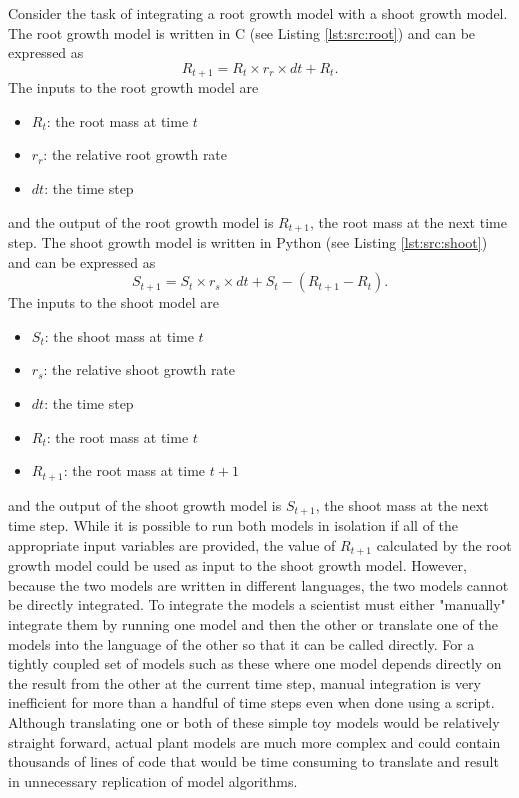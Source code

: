 \documentclass[journal]{IEEEtran}
\begin{document}
Consider the task of integrating a root growth model with a shoot growth model. The root growth model is written in C (see Listing \ref{lst:src:root}) and can be expressed as
\begin{equation}
R_{t+1} = R_{t} \times r_{r} \times dt + R_{t}.
\end{equation}
The inputs to the root growth model are
\begin{itemize}
	\item $R_{t}$: the root mass at time $t$
	\item $r_{r}$: the relative root growth rate
	\item $dt$: the time step
\end{itemize}
and the output of the root growth model is $R_{t+1}$, the root mass at the next time step. 
%
The shoot growth model is written in Python (see Listing \ref{lst:src:shoot}) and can be expressed as
\begin{equation}
S_{t+1} = S_{t} \times r_{s} \times dt + S_{t} - (R_{t+1} - R_{t}).
\end{equation}
The inputs to the shoot model are 
\begin{itemize}
	\item $S_{t}$: the shoot mass at time $t$
	\item $r_{s}$: the relative shoot growth rate
	\item $dt$: the time step
	\item $R_{t}$: the root mass at time $t$ 
	\item $R_{t+1}$: the root mass at time $t+1$ 
\end{itemize}
and the output of the shoot growth model is $S_{t+1}$, the shoot mass at the next time step.
%
While it is possible to run both models in isolation if all of the appropriate input variables are provided, the value of $R_{t+1}$ calculated by the root growth model could be used as input to the shoot growth model. However, because the two models are written in different languages, the two models cannot be directly integrated. To integrate the models a scientist must either "manually" integrate them by running one model and then the other or translate one of the models into the language of the other so that it can be called directly. For a tightly coupled set of models such as these where one model depends directly on the result from the other at the current time step, manual integration is very inefficient for more than a handful of time steps even when done using a script. Although translating one or both of these simple toy models would be relatively straight forward, actual plant models are much more complex and could contain thousands of lines of code that would be time consuming to translate and result in unnecessary replication of model algorithms.
\end{document}
